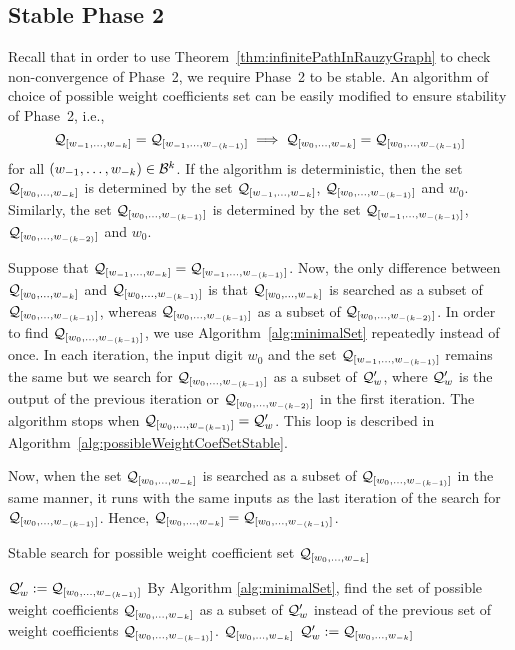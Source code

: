 \subsection*{Stable Phase 2}
Recall that in order to use Theorem~\ref{thm:infinitePathInRauzyGraph} to check non-convergence of Phase~2, we require Phase~2 to be stable. An algorithm of choice of possible weight coefficients set can be easily modified to ensure stability of Phase~2, i.e., 
$$\Qw{1}{k}=\Qw{1}{(k-1)} \implies \Qwo{k}=\Qwo{(k-1)}$$
for all $\tuple{1}{k}\in\B^k$. If the algorithm is deterministic, then the set $\Qwo{k}$ is determined by the set $\Qw{1}{k}$, $\Qwo{(k-1)}$ and $w_0$. Similarly, the set $\Qwo{(k-1)}$ is determined by  the set $\Qw{1}{(k-1)}$, $\Qwo{(k-2)}$ and $w_0$. 

Suppose that $\Qw{1}{k}=\Qw{1}{(k-1)}$. Now, the only difference between $\Qwo{k}$ and $\Qwo{(k-1)}$ is that $\Qwo{k}$ is searched as a subset of $\Qwo{(k-1)}$, whereas $\Qwo{(k-1)}$ as a subset of $\Qwo{(k-2)}$. In order to find  $\Qwo{(k-1)}$, we use Algorithm~\ref{alg:minimalSet} repeatedly instead of once. In each iteration, the input digit $w_0$ and the set $\Qw{1}{(k-1)}$ remains the same but we search for $\Qwo{(k-1)}$ as a subset of $\Q'_w$, where $\Q'_w$ is the output of the previous iteration or $\Qwo{(k-2)}$ in the first iteration. The algorithm stops when $\Qwo{(k-1)}=\Q'_w$. This loop is described in Algorithm~\ref{alg:possibleWeightCoefSetStable}.

Now, when the set $\Qwo{k}$ is searched as a subset of $\Qwo{(k-1)}$ in the same manner, it runs with the same inputs as the last iteration of the search for  $\Qwo{(k-1)}$. Hence, $\Qwo{k}=\Qwo{(k-1)}$.


\begin{algorithm}
  \caption{Stable search for possible weight coefficient set $\Qwo{k}$}
    \label{alg:possibleWeightCoefSetStable}
  \begin{algorithmic}[1]
	\STATE $\Q'_w:=\Qwo{(k-1)}$
		\STATE By Algorithm \ref{alg:minimalSet}, find the set of possible weight coefficients  $\Qwo{k}$ as a subset of $\Q'_w$ instead of the previous set of weight coefficients $\Qwo{(k-1)}$.
			\RETURN $\Qwo{k}$
		\ENDIF
		\STATE $\Q'_w:=\Qwo{k}$
	\ENDWHILE
  \end{algorithmic}
\end{algorithm}


